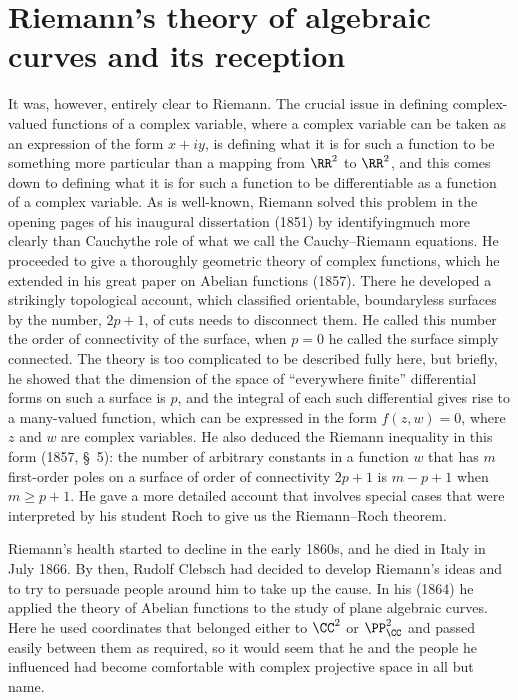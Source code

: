 \section{Riemann's theory of algebraic curves and its reception}
It was, however, entirely clear to Riemann. The crucial issue in defining
com\-plex-valued functions of a complex variable, where a complex
variable
%
can be taken as an expression of the form $x+ iy$, is defining what it is
for such a function to be something more particular than a mapping from
$\RR^2$ to $\RR^2$, and this comes down to defining what it is for such
a function to be differentiable as a function of a complex variable. As
is well-known, Riemann
%
%
solved this problem in the opening pages of
his inaugural dissertation  (1851) by identifying\emdash much more
clearly than Cauchy\emdash the role of what we call the Cauchy--Riemann
equations. He proceeded to give a thoroughly geometric theory of complex
functions, which he extended in his great paper on Abelian functions
%
(1857). There he developed a strikingly topological account, which
classified orientable, boundaryless surfaces by the number, $2p+1$,
of cuts needs to disconnect them. He called this number the order of
connectivity of the surface, when $p=0$ he called the surface simply
connected. The theory is too complicated to be described fully here,
but briefly, he showed that  the dimension of the space of ``everywhere
finite'' differential forms
%
on such a surface is $p$, and the integral
of each such
differential gives rise to a many-valued function, which can be expressed
in the form $f(z, w) = 0$, where $z$ and $w$ are complex variables. He
also deduced the Riemann inequality
%
in this form (1857, \S\, 5):  the
number of arbitrary constants in a function $w$ that has $m$ first-order
poles on a surface of order of connectivity $2p+1$ is $m- p + 1$ when $m
\geq p + 1$. He gave a more detailed account that involves special cases
%
that were interpreted by his student Roch to give us the Riemann--Roch
theorem.
%

Riemann's health started to decline in the early 1860s, and he  died
in Italy in July 1866. By then, Rudolf Clebsch had
%
decided to develop
Riemann's ideas and to try to persuade people around him to take up the
cause. In his (1864) he  applied the theory of Abelian functions to the
study of plane algebraic curves. Here he used coordinates that belonged
either to $\CC^2$ or $\PP_{\CC}^2$ and  passed easily between them as
required, so it would seem that he and the people he influenced had
become comfortable with complex projective space in all but name.

